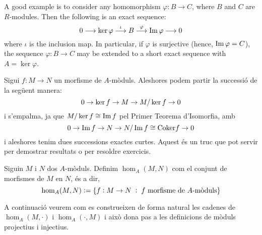 \documentclass[../../../main.tex]{subfiles}
\begin{document}
\begin{ej}
A good example is to consider any homomorphism $\varphi:B\to C$, where $B$ and $C$ are $R$-modules. Then the following is an exact sequence:
\begin{equation}
    \notag
    0\longrightarrow\ker\varphi\overset{\iota}{\longrightarrow}B\overset{\varphi}{\longrightarrow}\operatorname{Im}\varphi\longrightarrow 0
\end{equation}
where $\iota$ is the inclusion map. In particular, if $\varphi$ is surjective (hence, $\operatorname{Im}\varphi = C$), the sequence $\varphi:B\to C$ may be extended to a short exact sequence with $A = \ker\varphi$.
\end{ej}

\begin{nota}\label{nota:successioKerCoker}
Sigui $f:M\to N$ un morfisme de $A$-mòduls. Aleshores podem partir la successió de la següent manera:
\begin{equation}
    \notag
    0\to \ker f\to M\to M/\ker f\to 0
\end{equation}
i s'empalma, ja que $M/\ker f\cong \operatorname{Im} f$ pel Primer Teorema d'Isomorfia, amb
\begin{equation}
    \notag
    0\to \operatorname{Im} f\to N\to N/\operatorname{Im} f\cong \mathrm{Coker}f\to 0
\end{equation}
i aleshores tenim dues successions exactes curtes. Aquest és un truc que pot servir per demostrar resultats o per resoldre exercicis.
\end{nota}

\begin{defi}
Siguin $M$ i $N$ dos $A$-mòduls. Definim $\hom_A(M,N)$ com el conjunt de morfismes de $M$ en $N$, és a dir,
\begin{equation}
    \notag
    \hom_A(M,N):=\{f:M\to N\;:\;\text{$f$ morfisme de $A$-mòduls}\}
\end{equation}
\end{defi}

A continuació veurem com es construeixen de forma natural les cadenes de $\hom_A(M,\cdotp)$ i $\hom_A(\cdotp,M)$ i això dona pas a les definicions de mòduls projectius i injectius.
\end{document}
